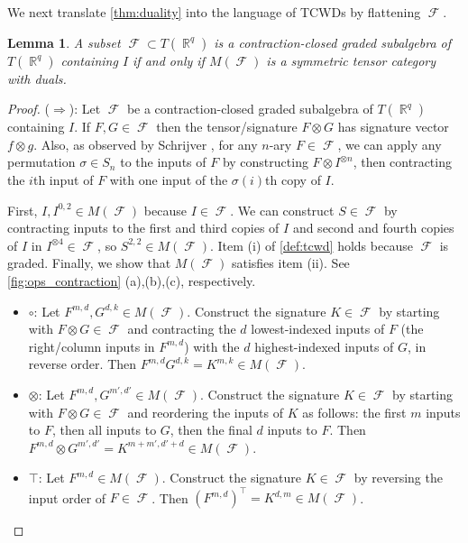 \documentclass{article}
\newtheorem{lemma}{Lemma}[section]
\theoremstyle{remark}
\theoremstyle{definition}
\DeclareMathOperator{\rr}{\mathbb{R}}
\DeclareMathOperator{\fc}{\mathcal{F}}
\begin{document}
We next translate \autoref{thm:duality} into the language of TCWDs by flattening
$\fc$. 
\begin{lemma}
    \label{lem:tcwd}
    A subset $\fc \subset T(\rr^q)$ is a contraction-closed graded subalgebra of $T(\rr^q)$ containing
    $I$ if and only if $M(\fc)$ is a symmetric tensor category with duals.
\end{lemma}
\begin{proof}
    ($\Longrightarrow$): Let $\fc$ be a contraction-closed graded subalgebra of $T(\rr^q)$ containing $I$. 
    If $F,G \in \fc$ then the tensor/signature $F \otimes G$ has signature vector $f \otimes g$.
    Also, as observed by Schrijver \cite{schrijver_tensor_2008}, 
    for any $n$-ary $F \in \fc$, we can apply any permutation $\sigma \in S_n$ to the inputs
    of $F$ by constructing $F \otimes I^{\otimes n}$, then contracting the $i$th input of $F$ with
    one input of the $\sigma(i)$th copy of $I$.

    First, $I,I^{0,2} \in M(\fc)$ because $I \in \fc$. We can construct $S \in \fc$ by contracting 
    inputs to the
    first and third copies of $I$ and second and fourth copies of $I$ in $I^{\otimes 4} \in \fc$,
    so $S^{2,2} \in M(\fc)$. Item (i) of \autoref{def:tcwd} holds because $\fc$ is graded.
    Finally, we show that $M(\fc)$ satisfies item (ii). See \autoref{fig:ops_contraction} (a),(b),(c),
    respectively.
    \begin{itemize}
        \item $\circ$: Let $F^{m,d}, G^{d,k} \in M(\fc)$. Construct the signature $K \in \fc$
        by starting with $F \otimes G \in \fc$ and
        contracting the $d$ lowest-indexed inputs of $F$ (the right/column inputs in 
        $F^{m,d}$)
       with the $d$ highest-indexed inputs of $G$, in reverse order. Then $F^{m,d}G^{d,k} = K^{m,k} \in
        M(\fc)$.
        \item $\otimes$: Let $F^{m,d}, G^{m',d'} \in M(\fc)$. Construct the signature $K \in \fc$ by starting
        with $F \otimes G \in \fc$ and reordering the inputs of $K$ as follows: the first $m$ inputs
        to $F$, then all inputs to $G$, then the final $d$ inputs to $F$.
        Then $F^{m,d} \otimes G^{m',d'} = K^{m+m',d'+d} \in M(\fc)$.
        \item $\top$: Let $F^{m,d} \in M(\fc)$. Construct the signature $K \in \fc$ by reversing the
            input order of $F \in \fc$. Then $(F^{m,d})^\top = K^{d,m} \in M(\fc)$.
    \end{itemize}
    \begin{figure}[ht!]
        \begin{center}
        \begin{subfigure}{0.4\textwidth}
            \begin{subfigure}{1\textwidth}
                \centering
\end{subfigure}
\end{subfigure}
\end{center}
\end{figure}
\end{proof}
\end{document}
